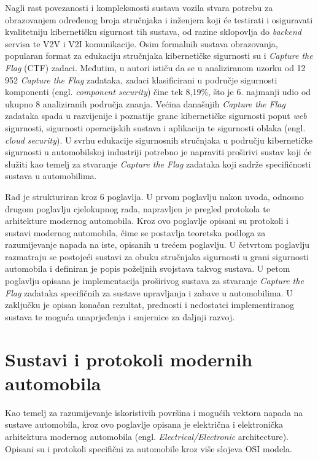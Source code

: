 \documentclass[times, utf8, diplomski, numeric]{fer}
\begin{document}
Nagli rast povezanosti i kompleksnosti sustava vozila stvara potrebu za obrazovanjem određenog broja stručnjaka i inženjera koji će testirati i osiguravati kvalitetniju kibernetičku sigurnost tih sustava, od razine sklopovlja do \textit{backend} servisa te V2V i V2I komunikacije. Osim formalnih sustava obrazovanja, popularan format za edukaciju stručnjaka kibernetičke sigurnosti su i \textit{Capture the Flag} (CTF) zadaci. Međutim, u \cite{vsvabensky2021cybersecurity} autori ističu da se u analiziranom uzorku od 12 952 \textit{Capture the Flag} zadataka, zadaci klasificirani u područje sigurnosti komponenti (engl. \textit{component security}) čine tek 8,19\%, što je 6. najmanji udio od ukupno 8 analiziranih područja znanja. Većina današnjih \textit{Capture the Flag} zadataka spada u razvijenije i poznatije grane kibernetičke sigurnosti poput \textit{web} sigurnosti, sigurnosti operacijskih sustava i aplikacija te sigurnosti oblaka (engl. \textit{cloud security})\cite{prinetto2020hardware}. U svrhu edukacije sigurnosnih stručnjaka u području kibernetičke sigurnosti u automobilskoj industriji potrebno je napraviti proširivi sustav koji će služiti kao temelj za stvaranje \textit{Capture the Flag} zadataka koji sadrže specifičnosti sustava u automobilima.

Rad je strukturiran kroz 6 poglavlja. U prvom poglavlju nakon uvoda, odnosno drugom poglavlju cjelokupnog rada, napravljen je pregled protokola te arhitekture modernog automobila. Kroz ovo poglavlje opisani su protokoli i sustavi modernog automobila, čime se postavlja teoretska podloga za razumijevanje napada na iste, opisanih u trećem poglavlju. U četvrtom poglavlju razmatraju se postojeći sustavi za obuku stručnjaka sigurnosti u grani sigurnosti automobila i definiran je popis poželjnih svojstava takvog sustava. U petom poglavlju opisana je implementacija proširivog sustava za stvaranje \textit{Capture the Flag} zadataka specifičnih za sustave upravljanja i zabave u automobilima. U zaključku je opisan konačan rezultat, prednosti i nedostatci implementiranog sustava te moguća unaprjeđenja i smjernice za daljnji razvoj.

\chapter{Sustavi i protokoli modernih automobila}
Kao temelj za razumijevanje iskoristivih površina i mogućih vektora napada na sustave automobila, kroz ovo poglavlje opisana je električna i elektronička arhitektura modernog automobila (engl. \textit{Electrical/Electronic} architecture). Opisani su i protokoli specifični za automobile kroz više slojeva OSI modela.
\end{document}
